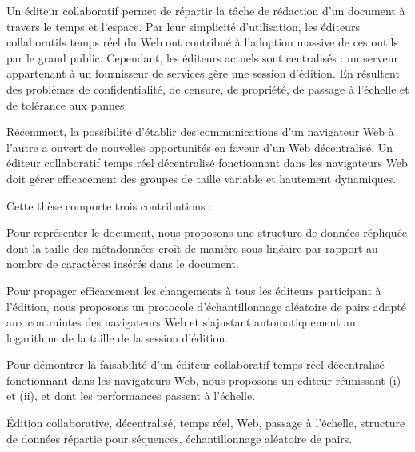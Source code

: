 
\begin{resume}
  Un éditeur collaboratif permet de répartir la tâche de rédaction d'un document
  à travers le temps et l'espace. Par leur simplicité d'utilisation, les
  éditeurs collaboratifs temps réel du Web ont contribué à l'adoption massive de
  ces outils par le grand public. Cependant, les éditeurs actuels sont
  centralisés : un serveur appartenant à un fournisseur de services gère une
  session d'édition. En résultent des problèmes de confidentialité, de censure,
  de propriété, de passage à l'échelle et de tolérance aux pannes.

  \noindent Récemment, la possibilité d'établir des communications d'un
  navigateur Web à l'autre a ouvert de nouvelles opportunités en faveur d'un Web
  décentralisé. Un éditeur collaboratif temps réel décentralisé fonctionnant
  dans les navigateurs Web doit gérer efficacement des groupes de taille
  variable et hautement dynamiques.

  \noindent Cette thèse comporte trois contributions :
  \begin{inparaenum}[(i)]
  \item Pour représenter le document, nous proposons une structure de données
    répliquée dont la taille des métadonnées croît de manière sous-linéaire par
    rapport au nombre de caractères insérés dans le document.
  \item Pour propager efficacement les changements à tous les éditeurs
    participant à l'édition, nous proposons un protocole d'échantillonnage
    aléatoire de pairs adapté aux contraintes des navigateurs Web et s'ajustant
    automatiquement au logarithme de la taille de la session d'édition.
  \item Pour démontrer la faisabilité d'un éditeur collaboratif temps réel
    décentralisé fonctionnant dans les navigateurs Web, nous proposons un
    éditeur réunissant (i) et (ii), et dont les performances passent à
    l'échelle.
  \end{inparaenum}
\end{resume}

\begin{motscles}
  Édition collaborative, décentralisé, temps réel, Web, passage à l'échelle,
  structure de données répartie pour séquences, échantillonnage aléatoire de
  pairs.
\end{motscles}


